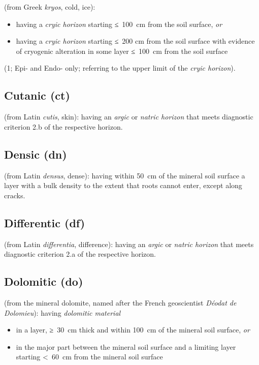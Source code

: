 \documentclass[
  letterpaper,
  DIV=11,
  numbers=noendperiod]{scrreprt}
\providecommand{\tightlist}{%
  \setlength{\itemsep}{0pt}\setlength{\parskip}{0pt}}\usepackage{longtable,booktabs,array}
\begin{document}
(from Greek \emph{kryos}, cold, ice):

\begin{itemize}
\tightlist
\item
  having a \emph{cryic horizon} starting ≤~100~cm from the soil surface,
  \emph{or}
\item
  having a \emph{cryic horizon} starting ≤~200 cm from the soil surface
  with evidence of cryogenic alteration in some layer ≤~100~cm from the
  soil surface
\end{itemize}

(1; Epi- and Endo- only; referring to the upper limit of the \emph{cryic
horizon}).

\hypertarget{cutanic-ct}{%
\subsection{Cutanic (ct)}\label{cutanic-ct}}

(from Latin \emph{cutis}, skin): having an \emph{argic} or \emph{natric
horizon} that meets diagnostic criterion 2.b of the respective horizon.

\hypertarget{densic-dn}{%
\subsection{Densic (dn)}\label{densic-dn}}

(from Latin \emph{densus}, dense): having within 50~cm of the mineral
soil surface a layer with a bulk density to the extent that roots cannot
enter, except along cracks.

\hypertarget{differentic-df}{%
\subsection{Differentic (df)}\label{differentic-df}}

(from Latin \emph{differentia}, difference): having an \emph{argic} or
\emph{natric horizon} that meets diagnostic criterion 2.a of the
respective horizon.

\hypertarget{dolomitic-do}{%
\subsection{Dolomitic (do)}\label{dolomitic-do}}

(from the mineral dolomite, named after the French geoscientist
\emph{Déodat de Dolomieu}): having \emph{dolomitic material}

\begin{itemize}
\tightlist
\item
  in a layer, ≥~30~cm thick and within 100~cm of the mineral soil
  surface, \emph{or}
\item
  in the major part between the mineral soil surface and a limiting
  layer starting \textless~60~cm from the mineral soil surface
\end{itemize}
\end{document}
